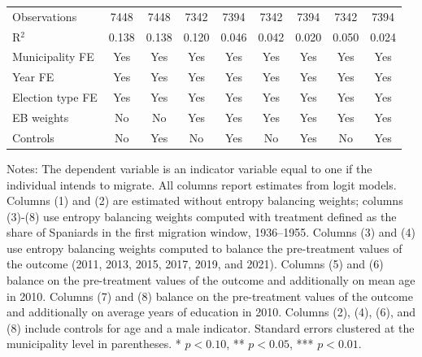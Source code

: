 \begin{table}
\begin{tabular}[t]{lcccccccc}
\addlinespace
Observations & 7448 & 7448 & 7342 & 7394 & 7342 & 7394 & 7342 & 7394\\
R$^2$ & 0.138 & 0.138 & 0.120 & 0.046 & 0.042 & 0.020 & 0.050 & 0.024\\
Municipality FE & Yes & Yes & Yes & Yes & Yes & Yes & Yes & Yes\\
Year FE & Yes & Yes & Yes & Yes & Yes & Yes & Yes & Yes\\
Election type FE & Yes & Yes & Yes & Yes & Yes & Yes & Yes & Yes\\
EB weights & No & No & Yes & Yes & Yes & Yes & Yes & Yes\\
Controls & No & Yes & No & Yes & No & Yes & No & Yes\\
\hline
\end{tabular}
\vspace{0.4em}
\begin{minipage}{\textwidth}
\footnotesize Notes: The dependent variable is an indicator variable equal to one if the individual intends to migrate. All columns report estimates from logit models. Columns (1) and (2) are estimated without entropy balancing weights; columns (3)-(8) use entropy balancing weights computed with treatment defined as the share of Spaniards in the first migration window, 1936–1955. Columns (3) and (4) use entropy balancing weights computed to balance the pre-treatment values of the outcome (2011, 2013, 2015, 2017, 2019, and 2021). Columns (5) and (6) balance on the pre-treatment values of the outcome and additionally on mean age in 2010. Columns (7) and (8) balance on the pre-treatment values of the outcome and additionally on average years of education in 2010. Columns (2), (4), (6), and (8) include controls for age and a male indicator. Standard errors clustered at the municipality level in parentheses. * $p<0.10$, ** $p<0.05$, *** $p<0.01$.
\end{minipage}
\end{table}
